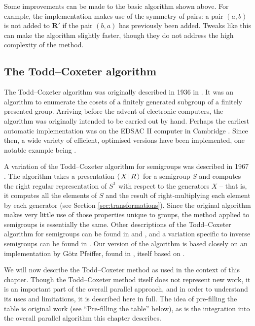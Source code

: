 Some improvements can be made to the basic algorithm shown above.  For example,
the \libsemigroups{} implementation makes use of the symmetry of pairs: a
pair $(a,b)$ is not added to $\mathbf{R}'$ if the pair $(b,a)$ has previously
been added.  Tweaks like this can make the algorithm slightly faster, though
they do not address the high complexity of the method.

\subsection{The Todd--Coxeter algorithm}
\label{sec:tc}

The Todd--Coxeter algorithm was originally described in 1936 in
\cite{todd_coxeter_1936}.  It was an algorithm to enumerate the cosets of a
finitely generated subgroup of a finitely presented group.  Arriving before the
advent of electronic computers, the algorithm was originally intended to be
carried out by hand.  Perhaps the earliest automatic implementation was on the
EDSAC II computer in Cambridge \cite{leech_1963}.  Since then, a wide variety of
efficient, optimised versions have been implemented, one notable example being
\ACE{} \cite{ace}.

A variation of the Todd--Coxeter algorithm for semigroups was described in 1967
\cite{neumann_1967}.  The algorithm takes a presentation $\left\langle \, X \, \middle| \, R \, \right\rangle$
for a semigroup $S$ and computes the right regular representation of $S^1$ with
respect to the generators $X$ -- that is, it computes all the elements of $S$ and
the result of right-multiplying each element by each generator (see Section
\ref{sec:transformations}).  Since the
original algorithm makes very little use of those properties unique to groups,
the method applied to semigroups is essentially the same.  Other descriptions of
the Todd--Coxeter algorithm for semigroups can be found in \cite[Chapter 12]{ruskuc_thesis} and
\cite[Chapter 1.2]{walker_thesis}, and a variation specific to inverse
semigroups can be found in \cite{cutting_thesis}.  Our version of the algorithm
is based closely on an implementation by G\"otz Pfeiffer, found in
\cite[\texttt{lib/tcsemi.gi}]{gap}, itself based on \cite{walker_thesis}.

We will now describe the Todd--Coxeter method as used in the context of this
chapter.  Though the Todd--Coxeter method itself does not represent new work, it is an
important part of the overall parallel approach, and in order to understand its
uses and limitations, it is described here in full.
The idea of pre-filling the table is original work (see ``Pre-filling the
table'' below), as is the integration into the overall parallel algorithm this
chapter describes.

